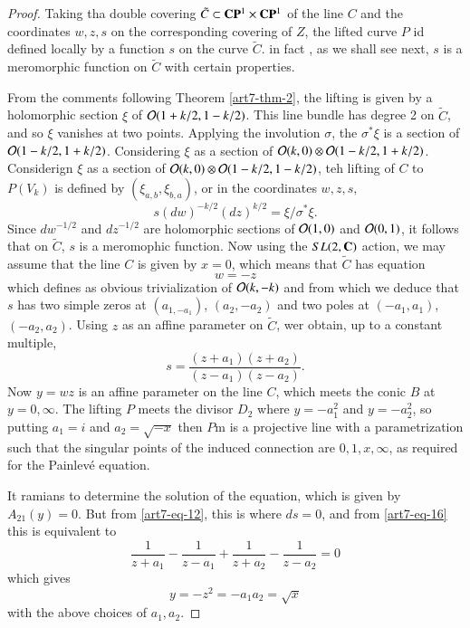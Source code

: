 \begin{proof}
Taking tha double covering $\tilde{C} \subset \mathbf{C}\mathbf{P}^{1} \times \mathbf{C}\mathbf{P}^{1}$ of the line $C$ and the coordinates $w,z,s$ on the corresponding covering of $Z$, the lifted curve $P$ id defined locally by a function $s$ on the curve
$\tilde{C}$. in fact , as we shall see next, $s$ is a meromorphic function on $\tilde{C}$ with certain properties.

From the comments following Theorem \ref{art7-thm-2}, the lifting is given by a holomorphic section $\xi$ of $\mathcal{O}(1+k/2, 1-k/2)$. This line bundle has degree 2 on $\tilde{C}$, and so $\xi$ vanishes at two points. Applying the involution $\sigma$, the $\sigma^{*}\xi$ is a section of $\mathcal{O}(1-k/2, 1+k/2)$. Considering $\xi$ as a section of $\mathcal{O}(k,0)\otimes \mathcal{O}(1-k/2, 1+k/2)$. Considerign $\xi$ as a section of $\mathcal{O}(k, 0)\otimes \mathcal{O}(1-k/2, 1-k/2)$, teh lifting of $C$ to $P(V_{k})$ is defined by $(\xi_{a,b}, \xi_{b,a})$, or in the coordinates $w,z,s,$
\begin{equation}\label{art7-eq-15}
s(dw)^{-k/2}(dz)^{k/2} = \xi/\sigma^{*}\xi.
\end{equation}
Since $dw^{-1/2}$ and $dz^{-1/2}$ are holomorphic sections of $\mathcal{O}(1,0)$ and $\mathcal{O}(0,1)$, it follows that on $\tilde{C}$, $s$ is a meromophic function. Now using the $SL(2, \mathbf{C})$ action, we may assume that the line $C$ is given by $x=0$, which means that $\tilde{C}$ has equation
$$
w= -z
$$
which defines as obvious trivialization of $\mathcal{O}(k,-k)$ and from which we deduce that $s$ has  two simple zeros at $(a_{1,-a_{1}})$, $(a_{2}, -a_{2})$ and two poles at $(-a_{1}, a_{1})$, $(-a_{2}, a_{2})$. Using $z$ as an affine parameter on $\tilde{C}$, wer obtain, up to a constant multiple,
\begin{equation}\label{art7-eq-16}
s = \dfrac{(z+a_{1})(z+a_{2})}{(z-a_{1})(z-a_{2})}.
\end{equation}
Now $y = wz$ is an affine parameter on the line $C$, which meets the conic $B$ at $y= 0, \infty$. The lifting $P$ meets the divisor $D_{2}$ where $y=-a_{1}^{2}$ and $y=-a_{2}^{2}$, so putting $a_{1}=i$ and $a_{2}=\sqrt{-x}$ then $P$m is a projective line with a parametrization such that the singular points of the induced connection are $0,1,x, \infty$, as required for the Painlev\'e equation.

It ramians to determine the solution of the equation, which is given by $A_{21}(y)=0$. But from \eqref{art7-eq-12}, this is where $ds=0$, and from \eqref{art7-eq-16} this is equivalent to
$$
\dfrac{1}{z+a_{1}}- \dfrac{1}{z-a_{1}}+\dfrac{1}{z+a_{2}}-\dfrac{1}{z-a_{2}} =0
$$
which gives
$$
y=-z^{2} = -a_{1}a_{2}= \sqrt{x}
$$
with the above choices of $a_{1}, a_{2}$.
\end{proof}

